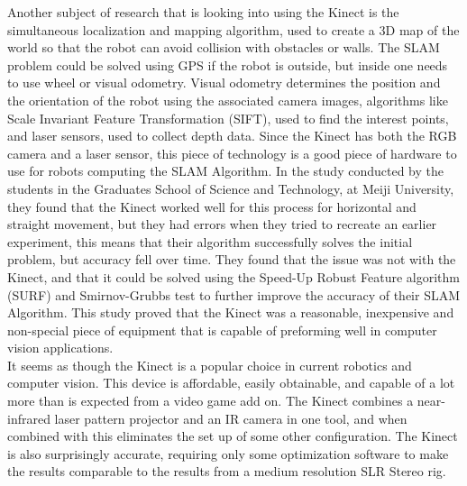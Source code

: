 \documentclass[12pt,twocolumn]{article}
\begin{document}
\indent	Another subject of research that is looking into using the Kinect is the simultaneous localization and mapping algorithm, used to create a 3D map of the world so that the robot can avoid collision with obstacles or walls. The SLAM problem could be solved using GPS if the robot is outside, but inside one needs to use wheel or visual odometry. Visual odometry determines the position and the orientation of the robot using the associated camera images, algorithms like Scale Invariant Feature Transformation (SIFT), used to find the interest points, and laser sensors, used to collect depth data. Since the Kinect has both the RGB camera and a laser sensor, this piece of technology is a good piece of hardware to use for robots computing the SLAM Algorithm. In the study conducted by the students in the Graduates School of Science and Technology, at Meiji University, they found that the Kinect worked well for this process for horizontal and straight movement, but they had errors when they tried to recreate an earlier experiment, this means that their algorithm successfully solves the initial problem, but accuracy fell over time.\cite{cite2} They found that the issue was not with the Kinect, and that it could be solved using the Speed-Up Robust Feature algorithm (SURF) and Smirnov-Grubbs test to further improve the accuracy of their SLAM Algorithm. This study proved that the Kinect was a reasonable, inexpensive and non-special piece of equipment that is capable of preforming well in computer vision applications. \\
\indent	It seems as though the Kinect is a popular choice in current robotics and computer vision. This device is affordable, easily obtainable, and capable of a lot more than is expected from a video game add on. The Kinect combines a near-infrared laser pattern projector and an IR camera in one tool, and when combined with this eliminates the set up of some other configuration. The Kinect is also surprisingly accurate, requiring only some optimization software to make the results comparable to the results from a medium resolution SLR Stereo rig.\\
\end{document}
